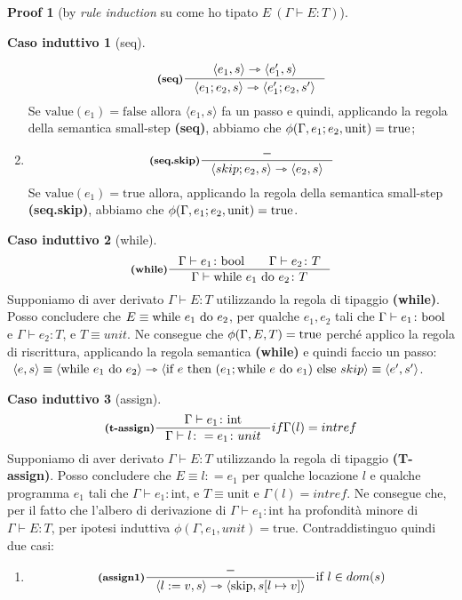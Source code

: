 \documentclass[a4paper, 10pt]{article}
\newcommand{\bool}{\textup{bool}}
\theoremstyle{definition}
\newtheorem{prf}{Proof}[]
\newtheorem{ind}{Caso induttivo}
\newcommand{\infer}[4]{\inference[\textbf{#1}]{#2}{#3}#4 }
\newcommand{\srule}[2]{\langle #1 \rangle \rightarrowtriangle \langle #2 \rangle}
\newcommand{\memrep}[3]{#1 \lbrack #2 \mapsto #3 \rbrack}
\begin{document}
\begin{multicols}{2}
\begin{prf}[by \textit{rule induction} su come ho tipato $ E\ (\Gamma \vdash E\colon T) $]
\begin{ind}[seq]
\begin{enumerate}
			\[
				\infer{(seq)}{\srule{e_1,s}{e_1',s}}{\srule{e_1;e_2,s}{e_1';e_2,s'}}{}
			\]
			Se $ \text{value}(e_1) = \text{false} $ allora $ \langle e_1, s \rangle $ fa un passo e quindi, applicando la regola della semantica small-step \textbf{(seq)}, abbiamo che $ \phi(\Gamma, e_1;e_2, \text{unit}) = \textup{true} $;
			\item
			\[
				\infer{(seq.skip)}{-}{\srule{skip;e_2,s}{e_2,s}}{}
			\]
			Se $ \text{value}(e_1) = \text{true} $ allora, applicando la regola della semantica small-step \textbf{(seq.skip)}, abbiamo che $ \phi(\Gamma, e_1;e_2, \text{unit}) = \textup{true} $.
		\end{enumerate}
	\end{ind}
	\begin{ind}[while]
		\[
			\infer{(while)}{\Gamma\vdash e_1 \colon \bool\qquad \Gamma\vdash e_2 \colon T}{\Gamma \vdash\textup{while}\ e_1\ \textup{do}\ e_2\colon T}{}
		\]
		Supponiamo di aver derivato $ \Gamma \vdash E\colon T $ utilizzando la regola di tipaggio \textbf{(while)}. Posso concludere che $ E\equiv \textup{while}\ e_1\ \textup{do}\ e_2 $, per qualche $ e_1, e_2 $ tali che $ \Gamma\vdash e_1 \colon \bool $ e $ \Gamma\vdash e_2 \colon T $, e $ T\equiv unit $. Ne consegue che $ \phi(\Gamma, E, T) = \textup{true} $ perché applico la regola di riscrittura, applicando la regola semantica \textbf{(while)} e quindi faccio un passo:
		$ \ \langle e, s \rangle \equiv \srule{\textup{while}\ e_1\ \textup{do}\ e_2}{\text{if } e \text{ then } (e_1; \text{while } e \text{ do } e_1) \text{ else } skip} \equiv \langle e', s'\rangle $.
	\end{ind}
	\columnbreak
	\begin{ind}[assign]
		\[
			\infer{(t-assign)}{\Gamma\vdash e_1\colon \text{int}}{\Gamma\vdash l\colon = e_1\colon unit}{if \Gamma(l) = intref}
		\]
		Supponiamo di aver derivato $ \Gamma\vdash E\colon T $ utilizzando la regola di tipaggio \textbf{(T-assign)}. Posso concludere che $ E\equiv l\colon = e_1 $ per qualche locazione $ l $ e qualche programma $ e_1 $ tali che $ \Gamma\vdash e_1 \colon \text{int} $, e $ T\equiv \text{unit} $ e $ \Gamma(l) = intref $. Ne consegue che, per il fatto che l'albero di derivazione di $ \Gamma\vdash e_1\colon \text{int} $ ha profondità minore di $ \Gamma\vdash E\colon T $, per ipotesi induttiva $ \phi(\Gamma, e_1, unit) =\text{true} $. Contraddistinguo quindi due casi:
		\begin{enumerate}
			\item
			\[
				\infer{(assign1)}{-}{\srule{l:=v,s}{\text{skip}, \memrep{s}{l}{v}}}{\text{if } l \in dom(s)} 
\]
\end{enumerate}
\end{ind}
\end{prf}
\end{multicols}
\end{document}
